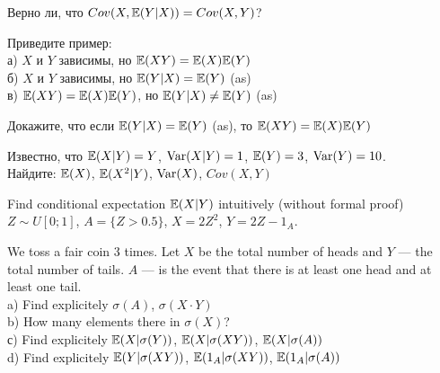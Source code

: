 \begin{solution}
\begin{solution}
\begin{solution}
\begin{solution}
\begin{solution}
\begin{solution}
\begin{solution}
\begin{problem}
Верно ли, что $Cov(X,\mathbb{E}(Y|X))=Cov(X,Y)$? 
\end{problem} 
\begin{solution} 

\end{solution}

\begin{problem}
Приведите пример: \\
а) $X$ и $Y$ зависимы, но $\mathbb{E}(XY)=\mathbb{E}(X)\mathbb{E}(Y)$ \\
б) $X$ и $Y$ зависимы, но $\mathbb{E}(Y|X)=\mathbb{E}(Y)$ (as) \\
в) $\mathbb{E}(XY)=\mathbb{E}(X)\mathbb{E}(Y)$, но $\mathbb{E}(Y|X)\neq \mathbb{E}(Y)$ (as) 
\end{problem} 
\begin{solution} 

\end{solution}

\begin{problem}
Докажите, что если $\mathbb{E}(Y|X)=\mathbb{E}(Y)$ (as), то $\mathbb{E}(XY)=\mathbb{E}(X)\mathbb{E}(Y)$ 
\end{problem} 
\begin{solution} 

\end{solution}

\begin{problem}
Известно, что $\mathbb{E}(X|Y)=Y$, $\operatorname{Var}(X|Y)=1$, $\mathbb{E}(Y)=3$, $\operatorname{Var}(Y)=10$. \\
Найдите: $\mathbb{E}(X)$, $\mathbb{E}(X^{2}|Y)$, $\operatorname{Var}(X)$, $Cov(X,Y)$ 
\end{problem} 
\begin{solution} 

\end{solution}

\begin{problem}
Find conditional expectation $\mathbb{E}(X|Y)$ intuitively (without formal proof)  \\
$Z\sim U[0;1]$, $A=\{Z>0.5\}$, $X=2Z^{2}$, $Y=2Z-1_{A}$.
\end{problem} 
\begin{solution} 

\end{solution}

\begin{problem}
We toss a fair coin 3 times. Let $X$ be the total number of heads and $Y$ --- the total number of tails. $A$ --- is the event that there is at least one head and at least one tail. \\
a) Find explicitely $\sigma(A)$, $\sigma(X\cdot Y)$ \\
b) How many elements there in $\sigma(X)$? \\
с) Find explicitely $\mathbb{E}(X|\sigma(Y))$, $\mathbb{E}(X|\sigma(XY))$, $\mathbb{E}(X|\sigma(A))$ \\
d) Find explicitely $\mathbb{E}(Y|\sigma(XY))$, $\mathbb{E}(1_{A}|\sigma(XY))$, $\mathbb{E}(1_{A}|\sigma(A))$ 
\end{problem} 
\begin{solution} 


\end{solution}
\end{solution}
\end{solution}
\end{solution}
\end{solution}
\end{solution}
\end{solution}
\end{solution}
